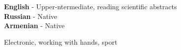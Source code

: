\documentclass[9pt]{developercv} %
\begin{document}
	
	\begin{minipage}[t]{0.3\textwidth}
		\vspace{-\baselineskip} %
		
		
		\textbf{English} - Upper-ntermediate, reading scientific abstracts\\
		\textbf{Russian} - Native\\
		\textbf{Armenian} - Native\\
	\end{minipage}
	\hfill
	\begin{minipage}[t]{0.3\textwidth}
		\vspace{-\baselineskip} %
		
		
		Electronic, working with hands, sport
	\end{minipage}
	\hfill
	
	
	
\end{document}
